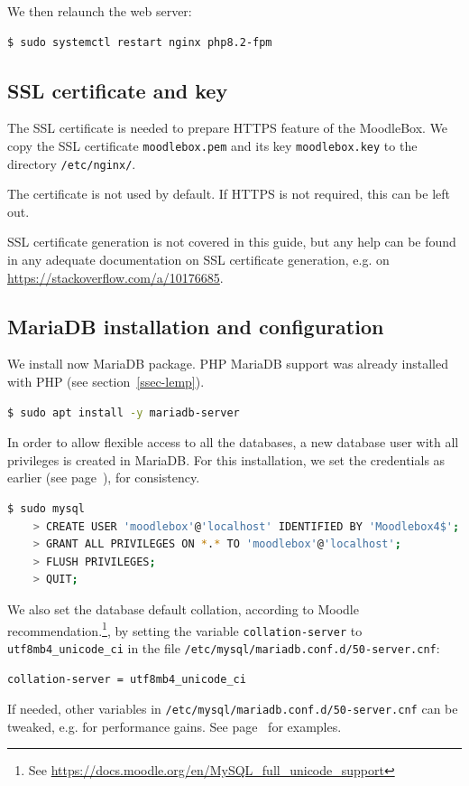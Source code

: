 \documentclass[12pt]{article}
\begin{document}
We then relaunch the web server:
\begin{lstlisting}[language=bash]
$ sudo systemctl restart nginx php8.2-fpm
\end{lstlisting}

\subsection{SSL certificate and key}

The SSL certificate is needed to prepare HTTPS feature of the MoodleBox.
We copy the SSL certificate \lstinline{moodlebox.pem} and its key \lstinline{moodlebox.key} to the directory \lstinline{/etc/nginx/}.

The certificate is not used by default.
If HTTPS is not required, this can be left out.

SSL certificate generation is not covered in this guide, but any help can be
found in any adequate documentation on SSL certificate generation, e.g. on \url{https://stackoverflow.com/a/10176685}.

\subsection{MariaDB installation and configuration}\label{ssec-mariadb}

We install now MariaDB package.
PHP MariaDB support was already installed with PHP (see section~\ref{ssec-lemp}).
\begin{lstlisting}[language=bash]
$ sudo apt install -y mariadb-server
\end{lstlisting}

In order to allow flexible access to all the databases, a new database user with all privileges is created in MariaDB.
For this installation, we set the credentials as earlier (see page~\pageref{page-credentials}), for consistency.

\begin{lstlisting}[language=bash]
$ sudo mysql
    > CREATE USER 'moodlebox'@'localhost' IDENTIFIED BY 'Moodlebox4$';
    > GRANT ALL PRIVILEGES ON *.* TO 'moodlebox'@'localhost';
    > FLUSH PRIVILEGES;
    > QUIT;
\end{lstlisting}
We also set the database default collation, according to Moodle recommendation.\footnote{See \url{https://docs.moodle.org/en/MySQL_full_unicode_support}}, by setting the variable \lstinline{collation-server} to \lstinline{utf8mb4_unicode_ci} in the file \lstinline{/etc/mysql/mariadb.conf.d/50-server.cnf}:
\begin{lstlisting}[language=bash]
collation-server = utf8mb4_unicode_ci
\end{lstlisting}
If needed, other variables in \lstinline{/etc/mysql/mariadb.conf.d/50-server.cnf} can be tweaked, e.g. for performance gains. See page~\pageref{ssec-mariadb-optimisation} for examples.
\end{document}
